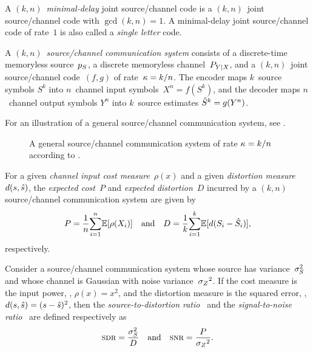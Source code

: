 \begin{definition}
  \label{def:mindelcode}
  A $(k,n)$~\emph{minimal-delay} joint source\slash channel code is a
  $(k,n)$~joint source/channel code with $\gcd(k,n) = 1$. A minimal-delay joint
  source/channel code of rate~$1$ is also called a \emph{single letter} code.
\end{definition}

\begin{definition}
  \label{def:jointsccommsys}
  A $(k,n)$~\emph{source/channel communication system} consists of
  a discrete-time memoryless source~${p_S}$, a discrete memoryless channel~$P_{Y|X}$,
  and a $(k,n)$~joint source/channel code~$(f,g)$ of rate~$\kappa = k/n$. The
  encoder maps $k$~source symbols $S^k$ into $n$~channel input symbols~$X^n =
  f(S^k)$, and the decoder maps $n$~channel output symbols $Y^n$ into $k$~source
  estimates ${\hat{S}}^k = g(Y^n)$.
\end{definition}

For an illustration of a general source/channel communication system, see
.
\begin{figure}[tbp]
  \begin{center}
    
  \end{center}
  \caption{A general source/channel communication system of rate $\kappa = k/n$
  according to .}
  \label{fig:gensccommsys}
\end{figure}

\begin{definition}
  \label{def:PDgen}
  For a given \emph{channel input cost measure}~$\rho(x)$ and a given
  \emph{distortion measure}~$d(s,{\hat{s}})$, the \emph{expected cost}~$P$ and
  \emph{expected distortion}~$D$ incurred by a $(k,n)$ source/channel
  communication system are given by
  \begin{equation*}
    P = \frac1n {\sum_{i=1}^n} \mathbb{E}[\rho(X_i)] \quad \text{and} \quad
    D = \frac1k {\sum_{i=1}^k} \mathbb{E}[d(S_i - {\hat{S}}_i)],
  \end{equation*}
  respectively.
\end{definition}

\begin{definition}
  \label{def:sdrsnr}
  Consider a source/channel communication system whose source has
  variance~${\sigma_S^2}$ and whose channel is Gaussian with noise variance~${{\sigma_Z}^2}$. If
  the cost measure is the input power, \ie, $\rho(x) = x^2$, and the distortion
  measure is the squared error, \ie, $d(s,{\hat{s}}) = (s - {\hat{s}})^2$, then the
  \emph{source-to-distortion ratio} \sdr\ and the \emph{signal-to-noise ratio}
  \snr\ are defined respectively as
  \begin{equation*}
    \sdr = \frac{\ssq}{D} \quad \text{and} \quad
    \snr = \frac{P}{\szq}.
  \end{equation*}
\end{definition}


